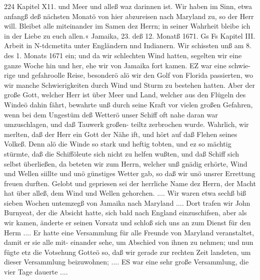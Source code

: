 224 Kapitel X11.
und Meer und alleß waz darinnen ist. Wir haben im Sinn,
etwa anfangß deß nächsten Monatö von hier abzureisen nach
Maryland zu, so der Herr will. Bleibet alle miteinander im
Samen dez Herrn; in seiner Wahrheit bleibe ich in der Liebe zu
euch allen.«
Jamaika, 23. deß 12. Monatß 1671. Gs Fs
Kapitel III.
Arbeit in N-tdcmetita unter Engländern nnd Indianern.
Wir schissten unß am 8. des 1. Monats 1671 ein; und da
wir schlechten Wind hatten, segelten wir eine ganze Woche hin
und her, ehe wir von Jamaika fort kamen. EZ war eine schwie-
rige und gefahroolle Reise, besonderö alö wir den Golf von
Florida passierten, wo wir manche Schwierigkeiten durch Wind
und Sturm zu bestehen hatten. Aber der große Gott, welcher
Herr ist über Meer und Land, welcher aus den Flügeln des
Windeö dahin fährt, bewahrte unß durch seine Kraft vor vielen
großen Gefahren, wenn bei dem Ungestüm deß Wetterö unser
Schiff oft nahe daran war umzuschlagen, und daß Tauwerk großen-
teiltz zerbrochen wurde. Wahrlich, wir merlten, daß der Herr ein
Gott der Nähe ift, und hört auf daß Flehen seines Volkeß. Denn
alö die Winde so stark und heftig tobten, und ez so mächtig
stürmte, daß die Schifföleute sich nicht zu helfen wußten, und
daß Schiff sich selbst überließen, da beteten wir zum Herrn, welcher
unß gnädig erhörte, Wind und Wellen siillte und unö günstiges
Wetter gab, so daß wir unö unsrer Errettung freuen durften.
Gelobt und gepriesen sei der herrliche Name dez Herrn, der
Macht hat über alleß, dem Wind und Wellen gehorchen. ....
Wir waren etwa sechß biß sieben Wochen untemzegß von
Jamaika nach Maryland .... Dort trafen wir John Burnyeat,
der die Absicht hatte, sich bald nach England einzuschifsen, aber
als wir kamen, änderte er seinen Vorsatz und schloß sich uns an
zum Dienst für den Herm .... Er hatte eine Versammlung für
alle Freunde von Maryland veranstaltet, damit er sie alle mit-
einander sehe, um Abschied von ihnen zu nehmen; und nun
fügte etz die Votsehung Gotteö so, daß wir gerade zur rechten
Zeit landeten, um dieser Versammlung beizuwohnen; .... ES
war eine sehr große Versammlung, die vier Tage dauerte ....


